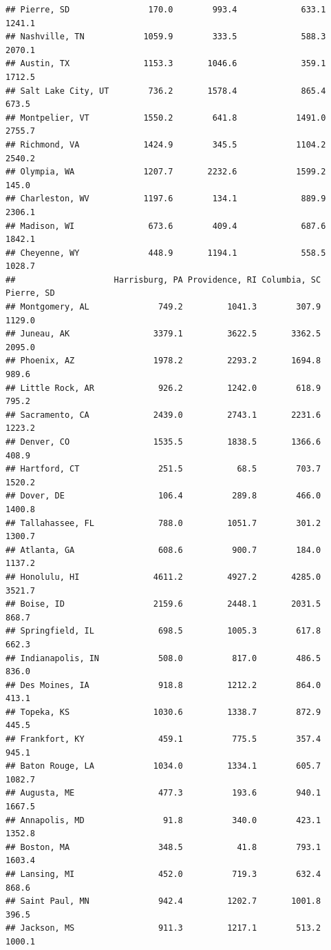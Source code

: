\documentclass[
]{article}
\begin{document}
\begin{verbatim}
## Pierre, SD                170.0        993.4             633.1    1241.1
## Nashville, TN            1059.9        333.5             588.3    2070.1
## Austin, TX               1153.3       1046.6             359.1    1712.5
## Salt Lake City, UT        736.2       1578.4             865.4     673.5
## Montpelier, VT           1550.2        641.8            1491.0    2755.7
## Richmond, VA             1424.9        345.5            1104.2    2540.2
## Olympia, WA              1207.7       2232.6            1599.2     145.0
## Charleston, WV           1197.6        134.1             889.9    2306.1
## Madison, WI               673.6        409.4             687.6    1842.1
## Cheyenne, WY              448.9       1194.1             558.5    1028.7
##                    Harrisburg, PA Providence, RI Columbia, SC Pierre, SD
## Montgomery, AL              749.2         1041.3        307.9     1129.0
## Juneau, AK                 3379.1         3622.5       3362.5     2095.0
## Phoenix, AZ                1978.2         2293.2       1694.8      989.6
## Little Rock, AR             926.2         1242.0        618.9      795.2
## Sacramento, CA             2439.0         2743.1       2231.6     1223.2
## Denver, CO                 1535.5         1838.5       1366.6      408.9
## Hartford, CT                251.5           68.5        703.7     1520.2
## Dover, DE                   106.4          289.8        466.0     1400.8
## Tallahassee, FL             788.0         1051.7        301.2     1300.7
## Atlanta, GA                 608.6          900.7        184.0     1137.2
## Honolulu, HI               4611.2         4927.2       4285.0     3521.7
## Boise, ID                  2159.6         2448.1       2031.5      868.7
## Springfield, IL             698.5         1005.3        617.8      662.3
## Indianapolis, IN            508.0          817.0        486.5      836.0
## Des Moines, IA              918.8         1212.2        864.0      413.1
## Topeka, KS                 1030.6         1338.7        872.9      445.5
## Frankfort, KY               459.1          775.5        357.4      945.1
## Baton Rouge, LA            1034.0         1334.1        605.7     1082.7
## Augusta, ME                 477.3          193.6        940.1     1667.5
## Annapolis, MD                91.8          340.0        423.1     1352.8
## Boston, MA                  348.5           41.8        793.1     1603.4
## Lansing, MI                 452.0          719.3        632.4      868.6
## Saint Paul, MN              942.4         1202.7       1001.8      396.5
## Jackson, MS                 911.3         1217.1        513.2     1000.1

\end{verbatim}
\end{document}
